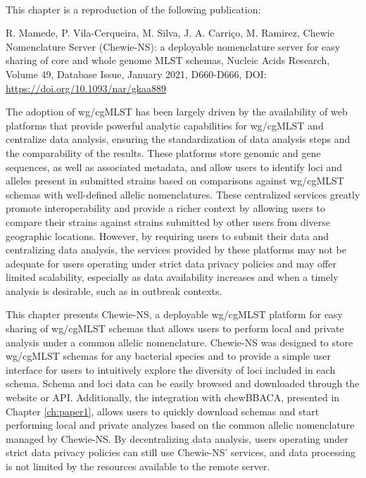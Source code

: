 \mbox{}\\
\vspace{8cm}

This chapter is a reproduction of the following publication:

R. Mamede, P. Vila-Cerqueira, M. Silva, J. A. Carriço, M. Ramirez, Chewie Nomenclature Server (Chewie-NS): a deployable nomenclature server for easy sharing of core and whole genome MLST schemas, Nucleic Acids Research, Volume 49, Database Issue, January 2021, D660-D666, DOI: \url{https://doi.org/10.1093/nar/gkaa889}

The adoption of \ac{wg/cgMLST} has been largely driven by the availability of web platforms that provide powerful analytic capabilities for \ac{wg/cgMLST} and centralize data analysis, ensuring the standardization of data analysis steps and the comparability of the results. These platforms store genomic and gene sequences, as well as associated metadata, and allow users to identify loci and alleles present in submitted strains based on comparisons against \ac{wg/cgMLST} schemas with well-defined allelic nomenclatures. These centralized services greatly promote interoperability and provide a richer context by allowing users to compare their strains against strains submitted by other users from diverse geographic locations. However, by requiring users to submit their data and centralizing data analysis, the services provided by these platforms may not be adequate for users operating under strict data privacy policies and may offer limited scalability, especially as data availability increases and when a timely analysis is desirable, such as in outbreak contexts.

This chapter presents \ac{Chewie-NS}, a deployable \ac{wg/cgMLST} platform for easy sharing of \ac{wg/cgMLST} schemas that allows users to perform local and private analysis under a common allelic nomenclature. \ac{Chewie-NS} was designed to store \ac{wg/cgMLST} schemas for any bacterial species and to provide a simple user interface for users to intuitively explore the diversity of loci included in each schema. Schema and loci data can be easily browsed and downloaded through the website or \ac{API}. Additionally, the integration with chewBBACA, presented in Chapter \ref{ch:paper1}, allows users to quickly download schemas and start performing local and private analyzes based on the common allelic nomenclature managed by \ac{Chewie-NS}. By decentralizing data analysis, users operating under strict data privacy policies can still use \ac{Chewie-NS}' services, and data processing is not limited by the resources available to the remote server.

